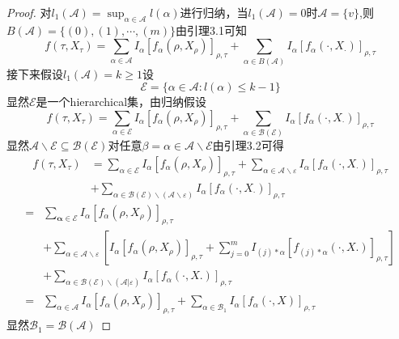 \documentclass{article}%
\begin{document}
\begin{proof}
	对$l_{1}(\mathcal{A})=\sup _{\alpha \in \mathcal{A}} l(\alpha)$进行归纳，当$l_1(\mathcal{A})=0$时$\mathcal{A}=\{v\}$,则$B(\mathcal{A})=\{(0),(1), \cdots,(m)\}$由引理3.1可知\begin{equation}
	f\left(\tau, X_{\tau}\right)=\sum_{\alpha \in \mathcal{A}} I_{\alpha}\left[f_{\alpha}\left(\rho, X_{\rho}\right)\right]_{\rho, \tau}+\sum_{\alpha \in B(\mathcal{A})} I_{\alpha}\left[f_{\alpha}\left(\cdot, X_{\cdot}\right)\right]_{\rho, \tau}
	\end{equation}
	接下来假设$l_1(\mathcal{A})=k\geq1$设
	$$
	\mathcal{E}=\{\alpha \in \mathcal{A}: l(\alpha) \leq k-1\}
	$$
	显然$\mathcal{E}$是一个hierarchical集，由归纳假设
	\begin{equation}
	f\left(\tau, X_{\tau}\right)=\sum_{\alpha \in \mathcal{E}} I_{\alpha}\left[f_{\alpha}\left(\rho, X_{\rho}\right)\right]_{\rho, \tau}+\sum_{\alpha \in \mathcal{B}(\mathcal{E})} I_{\alpha}\left[f_{\alpha}\left(\cdot, X_{\cdot}\right)\right]_{\rho, \tau}
	\end{equation}
	显然$\mathcal{A} \backslash \mathcal{E} \subseteq \mathcal{B}(\mathcal{E})$对任意$\beta=\alpha \in\mathcal{A}\backslash\mathcal{E}$由引理3.2可得
	\begin{equation}
	\begin{aligned}
	f\left(\tau, X_{\tau}\right)&=\sum_{\alpha \in \mathcal{E}} I_{\alpha}\left[f_{\alpha}\left(\rho, X_{\rho}\right)\right]_{\rho, \tau}+\sum_{\alpha \in \mathcal{A} \backslash \varepsilon} I_{\alpha}\left[f_{\alpha}\left(\cdot, X_{\cdot}\right)\right]_{\rho, \tau} \\
	&+\sum_{\alpha \in \mathcal{B}(\mathcal{E}) \backslash(\mathcal{A} \backslash \varepsilon)} I_{\alpha}\left[f_{\alpha}\left(\cdot, X_{\cdot}\right)\right]_{\rho, \tau}
	\end{aligned}
	\end{equation}
	$$
	\begin{aligned}
	=& \sum_{\boldsymbol{\alpha} \in \mathcal{E}} I_{\alpha}\left[f_{\alpha}\left(\rho, X_{\rho}\right)\right]_{\rho, \tau} \\
	&+\sum_{\alpha \in \mathcal{A} \backslash \varepsilon}\left[I_{\alpha}\left[f_{\alpha}\left(\rho, X_{\rho}\right)\right]_{\rho, \tau}+\sum_{j=0}^{m} I_{(j) * \alpha}\left[f_{(j) * \alpha}(\cdot, X .)\right]_{\rho, \tau}\right] \\
	&+\sum_{\alpha \in \mathcal{B}(\mathcal{E}) \backslash(\mathcal{A} | \varepsilon)} I_{\alpha}\left[f_{\alpha}(\cdot, X .)\right]_{\rho, \tau} \\
	=& \sum_{\alpha \in \mathcal{A}} I_{\alpha}\left[f_{\alpha}\left(\rho, X_{\rho}\right)\right]_{\rho, \tau}+\sum_{\alpha \in \mathcal{B}_{1}} I_{\alpha}\left[f_{\alpha}(\cdot, X)\right]_{\rho, \tau}
	\end{aligned}
	$$
	显然$\mathcal{B}_1=\mathcal{B}(\mathcal{A})$
\end{proof}
\end{document}
